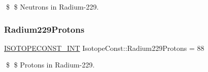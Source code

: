 \$ \$ Neutrons in Radium-\/229. \mbox{\label{group___isotope_const-_radium-_ra229_ga89d620f8a0871a7e46f15b66ec5d9be5}} 
\subsubsection{\texorpdfstring{Radium229\+Protons}{Radium229Protons}}
{\footnotesize\ttfamily \mbox{\hyperlink{group___isotope_const-_macros_ga5f18360b3e99483a35c32d789e62621c}{I\+S\+O\+T\+O\+P\+E\+C\+O\+N\+S\+T\+\_\+\+I\+NT}} Isotope\+Const\+::\+Radium229\+Protons = 88}

\$ \$ Protons in Radium-\/229. 